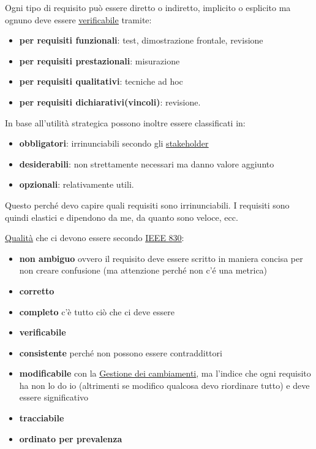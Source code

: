 		Ogni tipo di requisito può essere diretto o indiretto, implicito o esplicito ma ognuno deve essere \underline{\hyperref[verificare]{verificabile}} tramite:
		\begin{itemize}
			\item \textbf{per requisiti funzionali}: test, dimostrazione frontale, revisione
			\item \textbf{per requisiti prestazionali}: misurazione
			\item \textbf{per requisiti qualitativi}: tecniche ad hoc
			\item \textbf{per requisiti dichiarativi(vincoli)}: revisione.
		\end{itemize}

		In base all'utilità strategica possono inoltre essere classificati in:
		\begin{itemize}
			\item \textbf{obbligatori}: irrinunciabili secondo gli \underline{\hyperref[stakeholder]{stakeholder}}
			\item \textbf{desiderabili}: non strettamente necessari ma danno valore aggiunto
			\item \textbf{opzionali}: relativamente utili.
		\end{itemize}
		Questo perché devo capire quali requisiti sono irrinunciabili. I requisiti sono quindi elastici e dipendono da me, da quanto sono veloce, ecc.

		\underline{\hyperref[qualita]{Qualità}} che ci devono essere secondo \underline{\hyperref[ieee830]{IEEE 830}}:
		\begin{itemize} %
			\item \textbf{non ambiguo} ovvero il requisito deve essere scritto in maniera concisa per non creare confusione (ma attenzione perché non c'é una metrica)
			\item \textbf{corretto}
			\item \textbf{completo} c'è tutto ciò che ci deve essere
			\item \textbf{verificabile}
			\item \textbf{consistente} perché non possono essere contraddittori
			\item \textbf{modificabile} con la \underline{\hyperref[gestionecambiamenti]{Gestione dei cambiamenti}}, ma l'indice che ogni requisito ha non lo do io (altrimenti se modifico qualcosa devo riordinare tutto) e deve essere significativo
			\item \textbf{tracciabile}
			\item \textbf{ordinato per prevalenza}
		\end{itemize}

